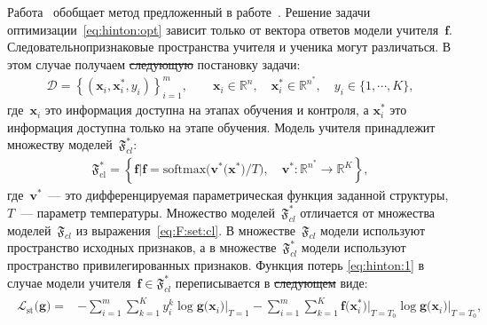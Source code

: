 \documentclass[12pt]{a&t}
\providecommand{\DIFadd}[1]{{\protect\color{blue}\uwave{#1}}} %
\providecommand{\DIFdel}[1]{{\protect\color{red}\sout{#1}}}                      %
\providecommand{\DIFaddbegin}{} %
\providecommand{\DIFaddend}{} %
\providecommand{\DIFdelbegin}{} %
\providecommand{\DIFdelend}{} %
\newcommand{\DIFscaledelfig}{0.5}
\newlength{\DIFdelgraphicswidth} %
\newlength{\DIFdelgraphicsheight} %
\newcommand{\DIFaddincludegraphics}[2][]{{\color{blue}\fbox{\DIFOincludegraphics[#1]{#2}}}} %
\newcommand{\DIFdelincludegraphics}[2][]{%
\sbox{\DIFdelgraphicsbox}{\DIFOincludegraphics[#1]{#2}}%
\settoboxwidth{\DIFdelgraphicswidth}{\DIFdelgraphicsbox} %
\settoboxtotalheight{\DIFdelgraphicsheight}{\DIFdelgraphicsbox} %
\scalebox{\DIFscaledelfig}{%
\parbox[b]{\DIFdelgraphicswidth}{\usebox{\DIFdelgraphicsbox}\\[-\baselineskip] \rule{\DIFdelgraphicswidth}{0em}}\llap{\resizebox{\DIFdelgraphicswidth}{\DIFdelgraphicsheight}{%
\setlength{\unitlength}{\DIFdelgraphicswidth}%
\begin{picture}(1,1)%
\thicklines\linethickness{2pt} %
{\color[rgb]{1,0,0}\put(0,0){\framebox(1,1){}}}%
{\color[rgb]{1,0,0}\put(0,0){\line( 1,1){1}}}%
{\color[rgb]{1,0,0}\put(0,1){\line(1,-1){1}}}%
\end{picture}%
}\hspace*{3pt}}} %
} %
\DeclareRobustCommand{\DIFaddbegin}{\DIFOaddbegin \let\includegraphics\DIFaddincludegraphics} %
\DeclareRobustCommand{\DIFaddend}{\DIFOaddend \let\includegraphics\DIFOincludegraphics} %
\DeclareRobustCommand{\DIFdelbegin}{\DIFOdelbegin \let\includegraphics\DIFdelincludegraphics} %
\DeclareRobustCommand{\DIFdelend}{\DIFOaddend \let\includegraphics\DIFOincludegraphics} %
\begin{document}
Работа~\cite{Lopez2016} обобщает метод предложенный в работе~\cite{Hinton2015}. Решение задачи оптимизации~\eqref{eq:hinton:opt} зависит только от вектора ответов модели учителя~$\mathbf{f}$. Следовательно\DIFaddbegin \DIFadd{, }\DIFaddend признаковые пространства учителя и ученика могут различаться. В этом случае получаем \DIFdelbegin \DIFdel{следующую }\DIFdelend постановку задачи:
\begin{gather}
    \mathcal{D} = \left\{\left(\mathbf{x}_i, \mathbf{x}^*_i, y_i\right)\right\}_{i=1}^{m}, \qquad \mathbf{x}_i \in \mathbb{R}^{n}, \quad \mathbf{x}^*_i \in \mathbb{R}^{n^*}, \quad y_i \in \{1, \cdots, K\},
\end{gather}
где~$\mathbf{x}_i$ это информация доступна на этапах обучения и контроля, а $\mathbf{x}^*_i$ это информация доступна только на этапе обучения. Модель учителя принадлежит множеству моделей~$\mathfrak{F}_{cl}^*$:
\begin{gather}
\label{eq:F:set:cl:priv}
\mathfrak{F}_{\text{cl}}^* = \left\{\mathbf{f}| \mathbf{f} = \text{softmax}\bigr(\mathbf{v}^*\bigr(\mathbf{x}^*\bigr)/T\bigr), \quad \mathbf{v}^*: \mathbb{R}^{n^*} \to \mathbb{R}^K \right\},
\end{gather}
где~$\mathbf{v}^*$~--- это дифференцируемая параметрическая функция заданной структуры, $T$~--- параметр температуры. Множество моделей~\DIFdelbegin \DIFdel{$\mathfrak{F}_{cl}^*$ }\DIFdelend \DIFaddbegin \DIFadd{$\mathfrak{F}_\text{cl}^*$ }\DIFaddend отличается от множества моделей~\DIFdelbegin \DIFdel{$\mathfrak{F}_{cl}$ }\DIFdelend \DIFaddbegin \DIFadd{$\mathfrak{F}_\text{cl}$ }\DIFaddend из выражения~\eqref{eq:F:set:cl}. В множестве~\DIFdelbegin \DIFdel{$\mathfrak{F}_{cl}$ }\DIFdelend \DIFaddbegin \DIFadd{$\mathfrak{F}_\text{cl}$ }\DIFaddend модели используют пространство исходных признаков, а в множестве~\DIFdelbegin \DIFdel{$\mathfrak{F}_{cl}^*$ }\DIFdelend \DIFaddbegin \DIFadd{$\mathfrak{F}_\text{cl}^*$ }\DIFaddend модели используют пространство привилегированных признаков. Функция потерь \eqref{eq:hinton:1} в случае модели учителя~\DIFdelbegin \DIFdel{$\mathbf{f} \in \mathfrak{F}_{cl}^*$ }\DIFdelend \DIFaddbegin \DIFadd{$\mathbf{f} \in \mathfrak{F}_\text{cl}^*$ }\DIFaddend переписывается в \DIFdelbegin \DIFdel{следующем }\DIFdelend виде:
\begin{gather}
\label{eq:hinton:L:new}
\DIFdelbegin %
\DIFdelend \DIFaddbegin \begin{aligned}
   \mathcal{L}_\text{st}\bigr(\mathbf{g}\bigr) = &-\sum_{i=1}^{m}{\sum_{k=1}^{K}y^k_i\log\mathbf{g}\bigr(\mathbf{x}_i\bigr)\bigr|_{T=1}}-\sum_{i=1}^{m}{\sum_{k=1}^{K}\mathbf{f}\bigr(\mathbf{x}^*_i\bigr)\bigr|_{T=T_0}\log\mathbf{g}\bigr(\mathbf{x}_i\bigr)\bigr|_{T=T_0}},
\end{aligned}\DIFaddend 
\end{gather}
\end{document}
